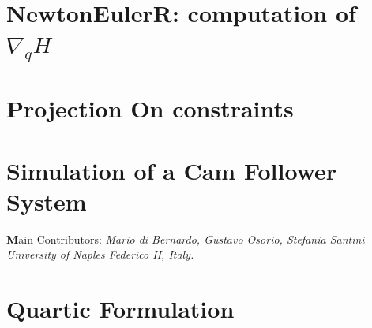 \documentclass[10pt]{report}
\begin{document}
\chapter{NewtonEulerR: computation of $\nabla _qH$}

\chapter{Projection On constraints}


%  


\chapter{Simulation of a Cam Follower System}
{\textbf Main Contributors:} {\textit{Mario di Bernardo, Gustavo Osorio, Stefania Santini}}\\
\textit{University of Naples Federico II, Italy.}\\


\chapter{Quartic Formulation}

\end{document}
